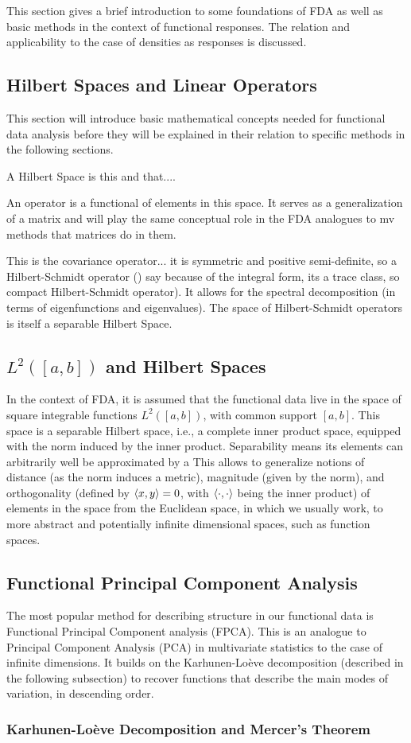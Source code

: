 This section gives a brief introduction to some foundations of FDA as well as basic
methods in the context of functional responses. The relation and applicability to the
case of densities as responses is discussed.

\subsection{Hilbert Spaces and Linear Operators}
\label{sec:hilber spaces and linear operators}
This section will introduce basic mathematical concepts needed for functional data
analysis before they will be explained in their relation to specific methods in the
following sections.

A Hilbert Space is this and that....

An operator is a functional of elements in this space. It serves as a generalization of
a matrix and will play the same conceptual role in the FDA analogues to mv methods
that matrices do in them.

This is the covariance operator... it is symmetric and positive semi-definite, so
a Hilbert-Schmidt operator ()\cite{WangChiouMüller2016} say because of the integral form,
its a trace class, so compact Hilbert-Schmidt operator). It allows for the spectral
decomposition (in terms of eigenfunctions and eigenvalues). The space of Hilbert-Schmidt
operators is itself a separable Hilbert Space.

\subsection{$L^2([a, b])$ and Hilbert Spaces}
\label{sec:l2 and hilbert spaces}
In the context of FDA, it is assumed that the functional data live in
the space of square integrable functions $L^2([a,b])$, with common
support $[a,b]$. This space is a separable Hilbert space, i.e., a complete inner
product space, equipped with the norm induced by the inner product. Separability means
its elements can arbitrarily well be approximated by a
This allows to generalize notions of distance (as the norm induces a
metric), magnitude (given by the norm), and orthogonality (defined by
$\left \langle x, y \right \rangle = 0$, with $\left \langle \cdot, \cdot \right \rangle$ being the inner product) of elements
in the space from the Euclidean space, in which we usually work, to more
abstract and potentially infinite dimensional spaces, such as function
spaces.

\subsection{Functional Principal Component Analysis}
\label{sec:fpca}
The most popular method for describing structure in our functional data is Functional
Principal Component analysis (FPCA). This is an analogue to Principal Component Analysis
(PCA) in multivariate statistics to the case of infinite dimensions. It builds on the
Karhunen-Loève decomposition (described in the following subsection) to recover functions
that describe the main modes of variation, in descending order.

\subsubsection{Karhunen-Loève Decomposition and Mercer's Theorem}
\label{sec:kh and mercer}
